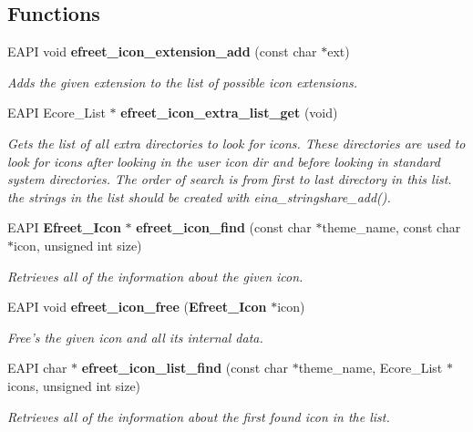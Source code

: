 \subsection*{Functions}
\begin{CompactItemize}
\item 
EAPI void {\bf efreet\_\-icon\_\-extension\_\-add} (const char $\ast$ext)
\begin{CompactList}\small\item\em Adds the given extension to the list of possible icon extensions. \item\end{CompactList}\item 
EAPI Ecore\_\-List $\ast$ {\bf efreet\_\-icon\_\-extra\_\-list\_\-get} (void)
\begin{CompactList}\small\item\em Gets the list of all extra directories to look for icons. These directories are used to look for icons after looking in the user icon dir and before looking in standard system directories. The order of search is from first to last directory in this list. the strings in the list should be created with eina\_\-stringshare\_\-add(). \item\end{CompactList}\item 
EAPI {\bf Efreet\_\-Icon} $\ast$ {\bf efreet\_\-icon\_\-find} (const char $\ast$theme\_\-name, const char $\ast$icon, unsigned int size)
\begin{CompactList}\small\item\em Retrieves all of the information about the given icon. \item\end{CompactList}\item 
EAPI void {\bf efreet\_\-icon\_\-free} ({\bf Efreet\_\-Icon} $\ast$icon)
\begin{CompactList}\small\item\em Free's the given icon and all its internal data. \item\end{CompactList}\item 
EAPI char $\ast$ {\bf efreet\_\-icon\_\-list\_\-find} (const char $\ast$theme\_\-name, Ecore\_\-List $\ast$icons, unsigned int size)
\begin{CompactList}\small\item\em Retrieves all of the information about the first found icon in the list. \item\end{CompactList}\item 

\end{CompactItemize}
